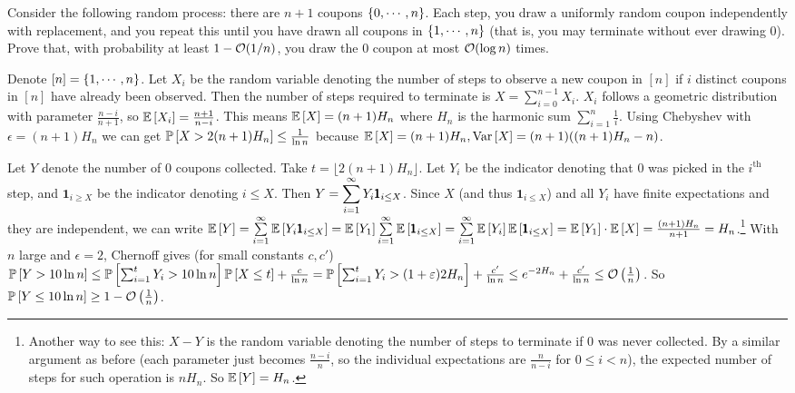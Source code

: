 \newpage
\pb
Consider the following random process: there are $n+1$ coupons $\set{0,\cdots,n}$. Each step, you draw a uniformly random coupon independently with replacement, and you
repeat this until you have drawn all coupons in $\set{1,\cdots,n}$ (that is, you may terminate without ever drawing $0$). Prove that, with probability at least $1-\cO(1/n)$, you draw the $0$ coupon at most $\cO(\log n)$ times.

\soln
Denote $[n]=\set{1,\cdots,n}$.
Let $X_{i}$ be the random variable denoting the number of steps to observe a new coupon in $[n]$ if $i$ distinct coupons in $[n]$ have already been observed. Then the number of steps required to terminate is $X = \sum_{i=0}^{n-1}X_{i}$. $X_{i}$ follows a geometric distribution with parameter $\frac{n-i}{n+1}$, so $\E{X_{i}} = \frac{n+1}{n-i}$. This means $\E{X} = (n+1)H_{n}$ where $H_{n}$ is the harmonic sum $\sum_{i=1}^{n}\frac1i$. Using Chebyshev with $\epsilon=(n+1)H_{n}$ we can get $\P{X>2(n+1)H_{n}} \le \frac{1}{\ln n}$ because $\E X = (n+1)H_{n},\Var X = (n+1)((n+1)H_{n}-n)$.

Let $Y$ denote the number of $0$ coupons collected. Take $t=\lfloor 2(n+1)H_{n}\rfloor$. Let $Y_{i}$ be the indicator denoting that $0$ was picked in the $i^{\text{th}}$ step, and $\pmb 1_{i\ge X}$ be the indicator denoting $i\le X$. Then $\ds Y=\sum\limits_{i=1}^{\infty}  Y_{i}\pmb 1_{i\le X}$. Since $X$ (and thus $\pmb 1_{i\le X}$) and all $Y_{i}$ have finite expectations and they are independent, we can write  $\E{Y} = \sum\limits_{i=1}^{\infty} \E{Y_{i}\pmb 1_{i\le X}} = \E{Y_{1}}\sum\limits_{i=1}^{\infty} \E{\pmb 1_{i\le X}}= \sum\limits_{i=1}^{\infty} \E{Y_{i}}\E{\pmb 1_{i\le X}} = \E{Y_{1}}\cdot \E X=\frac{(n+1)H_{n}}{n+1} = H_{n}$.\footnote{Another way to see this: $X-Y$ is the random variable denoting the number of steps to terminate if $0$ was never collected. By a similar argument as before (each parameter just becomes $\frac{n-i}{n}$, so the individual expectations are $\frac{n}{n-i}$ for $0\le i<n$), the expected number of steps for such operation is $nH_{n}$. So $\E Y = H_{n}$. } %
With $n$ large and $\epsilon=2$, Chernoff gives (for small constants $c,c'$) $\P{Y>10\ln n} \le \P{\sum_{i=1}^{t}Y_{i}>10\ln n}\P{X\le t}  + \frac{c}{\ln n} = \P{\sum_{i=1}^{t}Y_{i}>(1+\epsilon)2H_{n}} + \frac{c'}{\ln n} \le e^{-2H_{n}} + \frac{c'}{\ln n} \le \cO\left(\frac1n\right)$. So $\P{Y\le 10\ln n} \ge 1-\cO\left(\frac 1n\right)$. 




